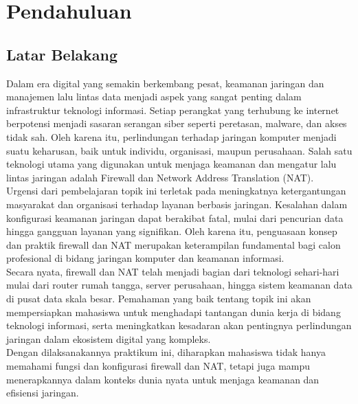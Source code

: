 \section{Pendahuluan}
\subsection{Latar Belakang}
Dalam era digital yang semakin berkembang pesat, keamanan jaringan dan manajemen lalu lintas data menjadi aspek yang sangat penting dalam infrastruktur teknologi informasi. Setiap perangkat yang terhubung ke internet berpotensi menjadi sasaran serangan siber seperti peretasan, malware, dan akses tidak sah. Oleh karena itu, perlindungan terhadap jaringan komputer menjadi suatu keharusan, baik untuk individu, organisasi, maupun perusahaan. Salah satu teknologi utama yang digunakan untuk menjaga keamanan dan mengatur lalu lintas jaringan adalah Firewall dan Network Address Translation (NAT). \\ Urgensi dari pembelajaran topik ini terletak pada meningkatnya ketergantungan masyarakat dan organisasi terhadap layanan berbasis jaringan. Kesalahan dalam konfigurasi keamanan jaringan dapat berakibat fatal, mulai dari pencurian data hingga gangguan layanan yang signifikan. Oleh karena itu, penguasaan konsep dan praktik firewall dan NAT merupakan keterampilan fundamental bagi calon profesional di bidang jaringan komputer dan keamanan informasi. \\ Secara nyata, firewall dan NAT telah menjadi bagian dari teknologi sehari-hari mulai dari router rumah tangga, server perusahaan, hingga sistem keamanan data di pusat data skala besar. Pemahaman yang baik tentang topik ini akan mempersiapkan mahasiswa untuk menghadapi tantangan dunia kerja di bidang teknologi informasi, serta meningkatkan kesadaran akan pentingnya perlindungan jaringan dalam ekosistem digital yang kompleks. \\ Dengan dilaksanakannya praktikum ini, diharapkan mahasiswa tidak hanya memahami fungsi dan konfigurasi firewall dan NAT, tetapi juga mampu menerapkannya dalam konteks dunia nyata untuk menjaga keamanan dan efisiensi jaringan.

